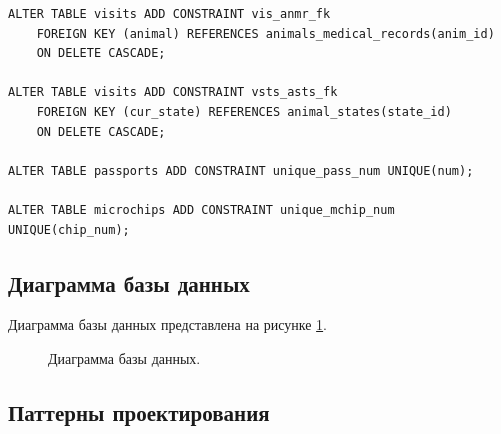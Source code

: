 \documentclass[a4paper,14pt]{article}
\begin{document}
\begin{lstlisting}[label=constraints,caption=\text{Создание органичений.}]
ALTER TABLE visits ADD CONSTRAINT vis_anmr_fk 
	FOREIGN KEY (animal) REFERENCES animals_medical_records(anim_id) 
	ON DELETE CASCADE;
	
ALTER TABLE visits ADD CONSTRAINT vsts_asts_fk 
	FOREIGN KEY (cur_state) REFERENCES animal_states(state_id) 
	ON DELETE CASCADE;
	
ALTER TABLE passports ADD CONSTRAINT unique_pass_num UNIQUE(num);
	
ALTER TABLE microchips ADD CONSTRAINT unique_mchip_num UNIQUE(chip_num);
\end{lstlisting}

\subsection{Диаграмма базы данных}

Диаграмма базы данных представлена на рисунке \ref{fig:db_dia}.


\begin{figure}[!h]
	\caption{Диаграмма базы данных.}
	\label{fig:db_dia}
\end{figure}

\subsection{Паттерны проектирования}
\end{document}
